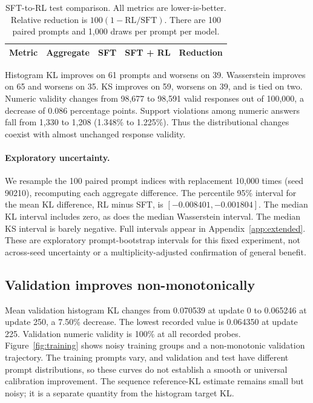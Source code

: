 \documentclass[11pt,letterpaper]{article}
\begin{document}
\begin{table}[htbp]
\centering\small
\caption{SFT-to-RL test comparison. All metrics are lower-is-better. Relative
reduction is $100(1-\mathrm{RL}/\mathrm{SFT})$. There are 100 paired prompts
and 1,000 draws per prompt per model.}
\label{tab:overall}
\begin{tabular}{@{}llrrr@{}}
\toprule
Metric & Aggregate & SFT & SFT + RL & Reduction\\
\midrule

\end{tabular}
\end{table}

Histogram KL improves on 61 prompts and worsens on 39. Wasserstein improves
on 65 and worsens on 35. KS improves on 59, worsens on 39, and is tied on
two. Numeric validity changes from 98,677 to 98,591 valid responses out of
100,000, a decrease of 0.086 percentage points. Support violations among
numeric answers fall from 1,330 to 1,208 (1.348\% to 1.225\%). Thus the
distributional changes coexist with almost unchanged response validity.

\paragraph{Exploratory uncertainty.}
We resample the 100 paired prompt indices with replacement 10,000 times
(seed 90210), recomputing each aggregate difference. The percentile 95\%
interval for the mean KL difference, RL minus SFT, is
$[-0.008401,-0.001804]$. The median KL interval includes zero, as does the
median Wasserstein interval. The median KS interval is barely negative.
Full intervals appear in Appendix~\ref{app:extended}. These are exploratory
prompt-bootstrap intervals for this fixed experiment, not across-seed
uncertainty or a multiplicity-adjusted confirmation of general benefit.

\subsection{Validation improves non-monotonically}
Mean validation histogram KL changes from 0.070539 at update 0 to 0.065246
at update 250, a 7.50\% decrease. The lowest recorded value is 0.064350 at
update 225. Validation numeric validity is 100\% at all recorded probes.
Figure~\ref{fig:training} shows noisy training groups and a non-monotonic
validation trajectory. The training prompts vary, and validation and test
have different prompt distributions, so these curves do not establish a
smooth or universal calibration improvement. The sequence reference-KL
estimate remains small but noisy; it is a separate quantity from the
histogram target KL.
\end{document}
